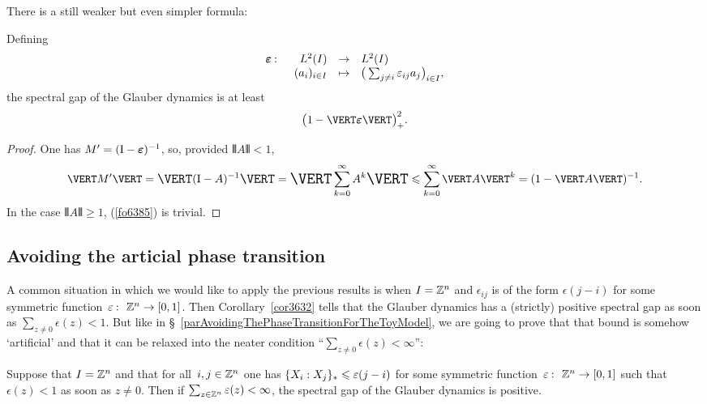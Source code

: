 There is a still weaker but even simpler formula:
\begin{Cor}\label{cor3632}
Defining
\[ \begin{array}{rrcl} \boldepsilon \colon & L^2(I) & \to & L^2(I) \\
& (a_i)_{i\in I} & \mapsto & \big( \sum_{j\neq i} \epsilon_{ij}a_j \big)_{i\in I} ,\end{array} \]
the spectral gap of the Glauber dynamics is at least
\[\label{fo6385} \big( 1 - \VERT \boldepsilon \VERT \big)_+^2 .\]
\end{Cor}
%
\begin{proof}
One has $M' = (\mathrm{I}-\boldsymbol{\varepsilon})^{-1}$, so, provided $\VERT A\VERT < 1$,
\[ \VERT M' \VERT = \big\VERT (\mrm{I}-A)^{-1} \big\VERT = \Big\VERT \sum_{k=0}^\infty A^k \Big\VERT
\leq \sum_{k=0}^\infty \VERT A \VERT^k = (1-\VERT A\VERT)^{-1} .\]
In the case $\VERT A\VERT \geq 1$, (\ref{fo6385}) is trivial.
\end{proof}


\subsection{Avoiding the articial phase transition}

A common situation in which we would like to apply the previous results is when $I = \mathbb{Z}^n$
and $\epsilon_{ij}$ is of the form $\epsilon(j-i)$
for some symmetric function~$\epsilon \colon \ZZ^n \to [0,1]$.
Then Corollary~\ref{cor3632} tells
that the Glauber dynamics has a (strictly) positive spectral gap as soon as
$\sum_{z\neq 0} \epsilon(z) < 1$.
But like in \S~\ref{parAvoidingThePhaseTransitionForTheToyModel},
we are going to prove that that bound is somehow `artificial'
and that it can be relaxed into the neater condition
``$\sum_{z\neq 0} \epsilon(z) < \infty$'':
%
\begin{Thm}\label{thm7431}
Suppose that $I = \mathbb{Z}^n$ and that for all~$i,j\in \mathbb{Z}^n$
one has ${\{X_i:X_j\}_\ast} \allowbreak \leqslant \varepsilon(j-i)$
for some symmetric function~$\epsilon \colon \ZZ^n \to [0,1]$
such that $\epsilon(z) < 1$ as soon as $z \neq 0$.
Then if $\sum_{z\in\mathbb{Z}^n} \varepsilon(z) < \infty$,
the spectral gap of the Glauber dynamics is positive.
\end{Thm}

